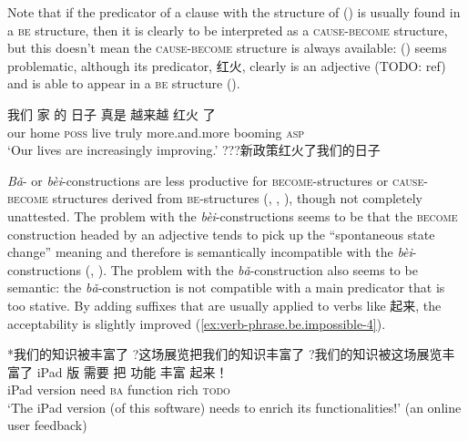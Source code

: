 \documentclass[UTF8, a4paper, oneside, scheme=plain, 12pt]{ctexrep}
\newcommand{\form}[1]{\emph{#1}}
\newcommand{\translate}[1]{`#1'}
\newcommand*{\category}[1]{\textsc{#1}}
\begin{document}
Note that if the predicator of 
a clause with the structure of ()
is usually found in a \category{be} structure, 
then it is clearly to be interpreted as a \category{cause}-\category{become} structure, 
but this doesn't mean the \category{cause}-\category{become} structure
is always available: 
() seems problematic,
although its predicator, 红火, clearly is an adjective (TODO: ref)
and is able to appear in a \category{be} structure 
().

\begin{exe}
    \ex\label{ex:verb-phrase.be-become.2} 
    \gll 我们 家 的 日子 真是 越来越 红火 了 \\
    our home \category{poss} live truly more.and.more booming \category{asp} \\
    \glt \translate{Our lives are increasingly improving.}
    \ex\label{ex:verb-phrase.be-become.cause-2} ???新政策红火了我们的日子
\end{exe}

\form{Bǎ}- or \form{bèi}-constructions are less productive 
for \category{become}-structures or \category{cause}-\category{become} structures 
derived from \category{be}-structures 
(,
,
),
though not completely unattested.
The problem with the \form{bèi}-constructions
seems to be that the \category{become} construction 
headed by an adjective tends to pick up the 
``spontaneous state change'' meaning 
and therefore is semantically incompatible with 
the \form{bèi}-constructions
(,
).
The problem with the \form{bǎ}-construction 
also seems to be semantic:
the \form{bǎ}-construction is not compatible with 
a main predicator that is too stative. 
By adding suffixes that are usually applied to verbs like 起来, 
the acceptability is slightly improved 
(\ref{ex:verb-phrase.be.impossible-4}).

\begin{exe}
    \ex\label{ex:verb-phrase.be.impossible-1} *我们的知识被丰富了
    \ex\label{ex:verb-phrase.be.impossible-2} ?这场展览把我们的知识丰富了
    \ex\label{ex:verb-phrase.be.impossible-3} ?我们的知识被这场展览丰富了
    \ex\label{ex:verb-phrase.be.impossible-4}
    \gll  iPad 版 需要 把 功能 丰富 起来！\\ 
    iPad version need \category{ba} function rich \category{todo} \\ 
    \glt \translate{The iPad version (of this software) needs to enrich its functionalities!} 
    (an online user feedback)
\end{exe}
\end{document}
